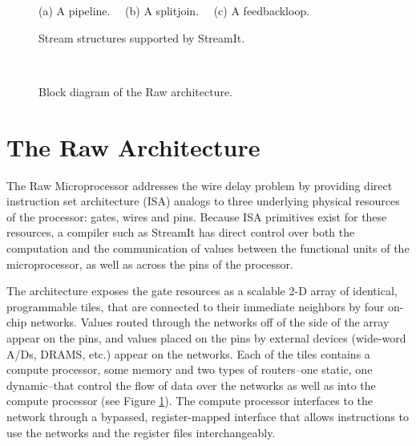 \begin{figure}[t]
\vspace{-12pt}
\begin{minipage}{3.2in}
\begin{center}
\begin{minipage}{0.46in}
\centering
{} \\
\end{minipage} 
~
\begin{minipage}{1.3in}
\centering
{} \\
\end{minipage}
~
\begin{minipage}{1.02in}
\centering
{} \\
\end{minipage} 
\\ ~ \\ {\protect\small (a) A pipeline. ~~(b) A splitjoin. ~~(c) A feedbackloop.}
\caption{Stream structures supported by StreamIt.
\protect\label{fig:structures}}
\end{center}
\end{minipage}
~~~~~
\begin{minipage}{3in}
\centering
\vspace{15pt}
\caption{Block diagram of the Raw architecture.
\protect\label{fig:raw-diagram}}
\end{minipage}
\vspace{-12pt}
\end{figure}

\section{The Raw Architecture}
\label{sec:raw}

The Raw Microprocessor \cite{raw10,raw} addresses the wire delay
problem \cite{raw13} by providing direct instruction set architecture
(ISA) analogs to three underlying physical resources of the processor:
gates, wires and pins. Because ISA primitives exist for these
resources, a compiler such as StreamIt has direct control over both
the computation and the communication of values between the functional
units of the microprocessor, as well as across the pins of the
processor.

The architecture exposes the gate resources as a scalable 2-D array of
identical, programmable tiles, that are connected to their immediate
neighbors by four on-chip networks.  Values routed through the
networks off of the side of the array appear on the pins, and values
placed on the pins by external devices (wide-word A/Ds, DRAMS, etc.)
appear on the networks.  Each of the tiles contains a compute
processor, some memory and two types of routers--one static, one
dynamic--that control the flow of data over the networks as well as
into the compute processor (see Figure \ref{fig:raw-diagram}).  The
compute processor interfaces to the network through a bypassed,
register-mapped interface \cite{raw10} that allows instructions to use
the networks and the register files interchangeably.

